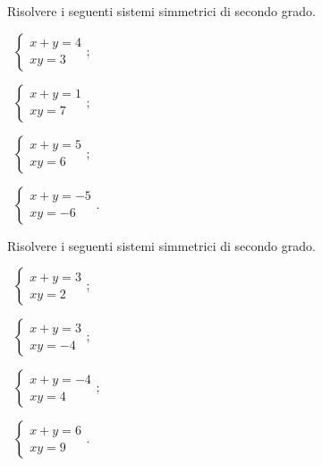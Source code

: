 \begin{esercizio}[\Ast]
 \label{ese:6.22}
Risolvere i seguenti sistemi simmetrici di secondo grado.
\begin{multicols}{2}
 \begin{enumeratea}
 \item~$\left\{\begin{array}{l}x+y=4\\{xy}=3\end{array}\right.$;
 \item~$\left\{\begin{array}{l}x+y=1\\{xy}=7 \end{array}\right.$;
 \item~$\left\{\begin{array}{l}x+y=5\\{xy}=6 \end{array}\right.$;
 \item~$\left\{\begin{array}{l}x+y=-5\\{xy}=-6 \end{array}\right.$.
 \end{enumeratea}
 \end{multicols}
\end{esercizio}
\pagebreak
\begin{esercizio}[\Ast]
 \label{ese:6.23}
Risolvere i seguenti sistemi simmetrici di secondo grado.
\begin{multicols}{2}
 \begin{enumeratea}
 \item~$\left\{\begin{array}{l}x+y=3\\{xy}=2 \end{array}\right.$;
 \item~$\left\{\begin{array}{l}x+y=3\\{xy}=-4\end{array}\right.$;
 \item~$\left\{\begin{array}{l}x+y=-4\\{xy}=4 \end{array}\right.$;
 \item~$\left\{\begin{array}{l}x+y=6\\{xy}=9 \end{array}\right.$.
 \end{enumeratea}
 \end{multicols}
\end{esercizio}

